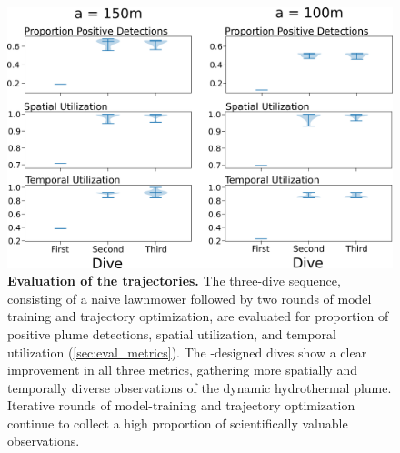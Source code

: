 \begin{figure}[h!]
    \centering
    \includegraphics[width=0.75\columnwidth]{figures/sim_traj_performance.png}
    \caption{\textbf{Evaluation of the \PHORTEX trajectories.} The three-dive sequence, consisting of a naive lawnmower followed by two rounds of \PHUMES model training and \PHORTEX trajectory optimization, are evaluated for proportion of positive plume detections, spatial utilization, and temporal utilization (\cref{sec:eval_metrics}). The \PHORTEX-designed dives show a clear improvement in all three metrics, gathering more spatially and temporally diverse observations of the dynamic hydrothermal plume. Iterative rounds of \PHORTEX model-training and trajectory optimization continue to collect a high proportion of scientifically valuable observations.}
    \label{fig:sim_traj_perform}
\end{figure}



